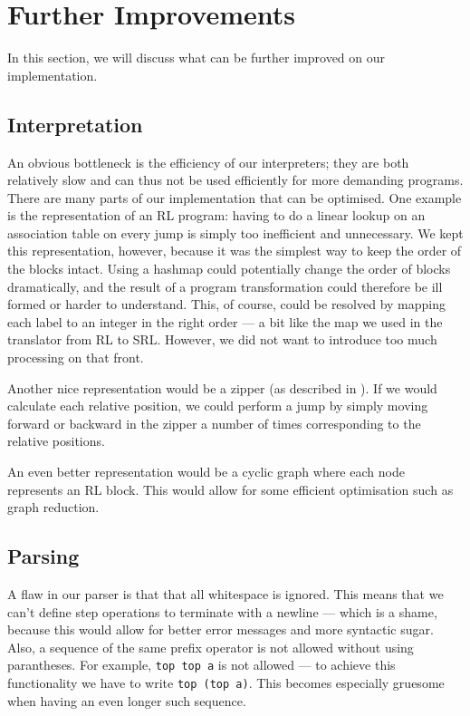 \section{Further Improvements}
In this section, we will discuss what can be further improved on our implementation.

\subsection{Interpretation}
An obvious bottleneck is the efficiency of our interpreters; they are both relatively slow and can thus not be used efficiently for more demanding programs. There are many parts of our implementation that can be optimised. One example is the representation of an RL program: having to do a linear lookup on an association table on every jump is simply too inefficient and unnecessary. We kept this representation, however, because it was the simplest way to keep the order of the blocks intact. Using a hashmap could potentially change the order of blocks dramatically, and the result of a program transformation could therefore be ill formed or harder to understand. This, of course, could be resolved by mapping each label to an integer in the right order --- a bit like the map we used in the translator from RL to SRL. However, we did not want to introduce too much processing on that front.

Another nice representation would be a zipper (as described in \cite{ZIP}). If we would calculate each relative position, we could perform a jump by simply moving forward or backward in the zipper a number of times corresponding to the relative positions.

An even better representation would be a cyclic graph where each node represents an RL block. This would allow for some efficient optimisation such as graph reduction.


\subsection{Parsing}
A flaw in our parser is that that all whitespace is ignored. This means that we can't define step operations to terminate with a newline --- which is a shame, because this would allow for better error messages and more syntactic sugar. Also, a sequence of the same prefix operator is not allowed without using parantheses. For example, \texttt{top top a} is not allowed --- to achieve this functionality we have to write \texttt{top (top a)}. This becomes especially gruesome when having an even longer such sequence.

